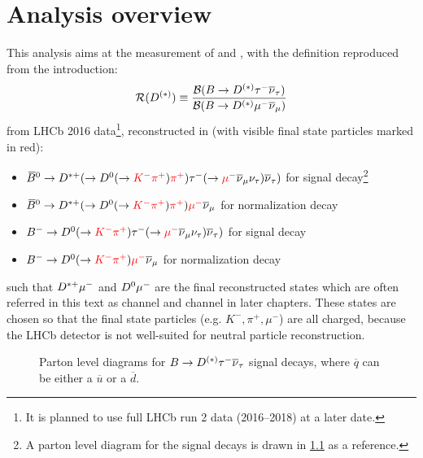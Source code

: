 \chapter{Analysis overview}
\label{ref:overview}

This analysis aims at the measurement of \RD and \RDst,
with the definition reproduced from the introduction:
\begin{equation}
    \mathcal{R}(D^{(*)}) \equiv \frac{\mathcal{B}(B \rightarrow D^{(*)} {\tau^-} {{\overline{\nu}}_\tau})}{\mathcal{B}(B \rightarrow D^{(*)} {\mu^-} {{\overline{\nu}}_\mu})}
\end{equation}
from LHCb 2016 data\footnote{
    It is planned to use full LHCb run 2 data (2016--2018) at a later date.
}, reconstructed in (with visible final state particles marked in red):
\begin{itemize}
    \item ${{\kern 0.18em\overline{\kern -0.18em B}}{}^0} \rightarrow {\ensuremath{{D}^{*+}}} (\rightarrow {\ensuremath{{D}^0}} (\rightarrow \textcolor{red}{{{K}^-} {{\pi}^+}})\textcolor{red}{{{\pi}^+}}) {\tau^-} (\rightarrow \textcolor{red}{{\mu^-}} {{\overline{\nu}}_\mu} {{\nu}_\tau}) {{\overline{\nu}}_\tau})$
        for \RDst signal decay\footnote{
            A parton level diagram for the signal decays is drawn in
            \cref{fig:decay-diagrams} as a reference.
        }
    \item ${{\kern 0.18em\overline{\kern -0.18em B}}{}^0} \rightarrow {\ensuremath{{D}^{*+}}} (\rightarrow {\ensuremath{{D}^0}} (\rightarrow \textcolor{red}{{{K}^-} {{\pi}^+}})\textcolor{red}{{{\pi}^+}}) \textcolor{red}{{\mu^-}} {{\overline{\nu}}_\mu}$
        for \RDst normalization decay
    \item ${{{B}^-}} \rightarrow {\ensuremath{{D}^0}} (\rightarrow \textcolor{red}{{{K}^-} {{\pi}^+}}) {\tau^-} (\rightarrow \textcolor{red}{{\mu^-}} {{\overline{\nu}}_\mu} {{\nu}_\tau}) {{\overline{\nu}}_\tau})$
        for \RD signal decay
    \item ${{{B}^-}} \rightarrow {\ensuremath{{D}^0}} (\rightarrow \textcolor{red}{{{K}^-} {{\pi}^+}}) \textcolor{red}{{\mu^-}} {{\overline{\nu}}_\mu}$
        for \RD normalization decay
\end{itemize}
such that ${{D}^{*+}}{\mu^-}$ and ${{D}^0}{\mu^-}$ are the final reconstructed states
which are often referred in this text as \Dstar channel and \Dz channel in later
chapters.
These states are chosen so that the final state particles
(e.g. $K^-, \pi^+, \mu^-$) are all charged,
because the LHCb detector is not well-suited for neutral particle
reconstruction.

\begin{figure}[!htb]
    \centering
    \resizebox{0.8\textwidth}{!}{
        
    }

    \caption{
        Parton level diagrams for $B \rightarrow D^{(*)} {\tau^-}{{\overline{\nu}}_\tau}$ signal
        decays,
        where $\overline q$ can be either a $\overline u$ or a $\overline d$.
    }
    \label{fig:decay-diagrams}
\end{figure}


